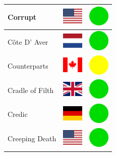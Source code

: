 \documentclass[12pt, a4paper, twoside]{report}
\begin{document}
\begin{center}
\begin{longtable}{|p{5cm}|p{2cm}|p{2cm}|}
 Corrupt                                                    & \includegraphics[width=1cm]{../4x3/us} &   \includegraphics[width=1cm]{../likes/y} \\ \hline
 Côte D' Aver                                               & \includegraphics[width=1cm]{../4x3/nl} &   \includegraphics[width=1cm]{../likes/y} \\ \hline
 Counterparts                                               & \includegraphics[width=1cm]{../4x3/ca} &   \includegraphics[width=1cm]{../likes/m} \\ \hline
 Cradle of Filth                                            & \includegraphics[width=1cm]{../4x3/gb} &   \includegraphics[width=1cm]{../likes/y} \\ \hline
 Credic                                                     & \includegraphics[width=1cm]{../4x3/de} &   \includegraphics[width=1cm]{../likes/y} \\ \hline
 Creeping Death                                             & \includegraphics[width=1cm]{../4x3/us} &   \includegraphics[width=1cm]{../likes/y} \\ \hline

\end{longtable}
\end{center}
\end{document}
